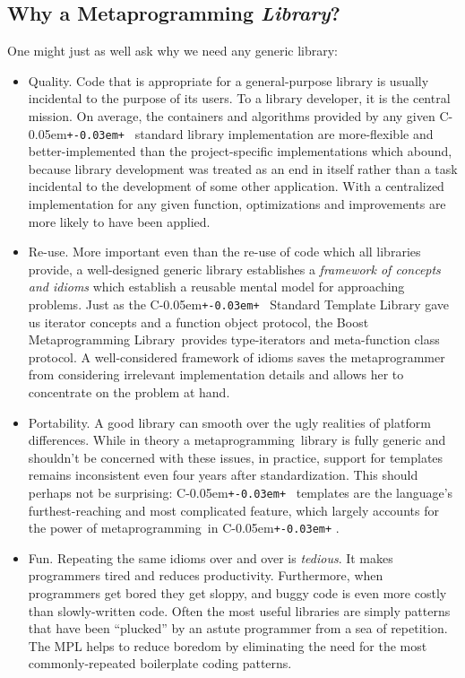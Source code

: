 \documentclass{kapproc}
\newcommand{\Cpp}{C\kern-0.05em\texttt{+\kern-0.03em+}%
}
\newcommand{\Mpl}{Boost Meta\-pro\-gram\-ming Library}
\newcommand{\mping}{meta\-pro\-gram\-ming}
\newcommand{\mpgmer}{meta\-pro\-gram\-mer}
\begin{document}
\subsection{Why a Metaprogramming \emph{Library}?}

One might just as well ask why we need any generic library: 
 
\begin{itemize}

\item Quality. Code that is appropriate for a general-purpose library
  is usually incidental to the purpose of its users. To a library
  developer, it is the central mission. On average, the containers and
  algorithms provided by any given \Cpp\ standard library
  implementation are more-flexible and better-implemented than the
  project-specific implementations which abound, because library
  development was treated as an end in itself rather than a task
  incidental to the development of some other application. With a
  centralized implementation for any given function, optimizations and
  improvements are more likely to have been applied.

\item Re-use. More important even than the re-use of code which all
  libraries provide, a well-designed generic library establishes a
  \emph{framework of concepts and idioms} which establish a reusable
  mental model for approaching problems. Just as the \Cpp\ Standard
  Template Library gave us iterator concepts and a function object
  protocol, the \Mpl\ provides type-iterators and meta-function class
  protocol. A well-considered framework of idioms saves the \mpgmer{}
  from considering irrelevant implementation details and allows her to
  concentrate on the problem at hand.

\item Portability. A good library can smooth over the ugly realities
  of platform differences. While in theory a \mping\ library is fully
  generic and shouldn't be concerned with these issues, in practice,
  support for templates remains inconsistent even four years after
  standardization. This should perhaps not be surprising: \Cpp\
  templates are the language's furthest-reaching and most complicated
  feature, which largely accounts for the power of \mping\ in \Cpp.

\item Fun. Repeating the same idioms over and over is
  \emph{tedious}. It makes programmers tired and reduces
  productivity. Furthermore, when programmers get bored they get
  sloppy, and buggy code is even more costly than slowly-written
  code. Often the most useful libraries are simply patterns that have
  been ``plucked'' by an astute programmer from a sea of
  repetition. The MPL helps to reduce boredom by eliminating the need
  for the most commonly-repeated boilerplate coding patterns.

\end{itemize}
\end{document}

